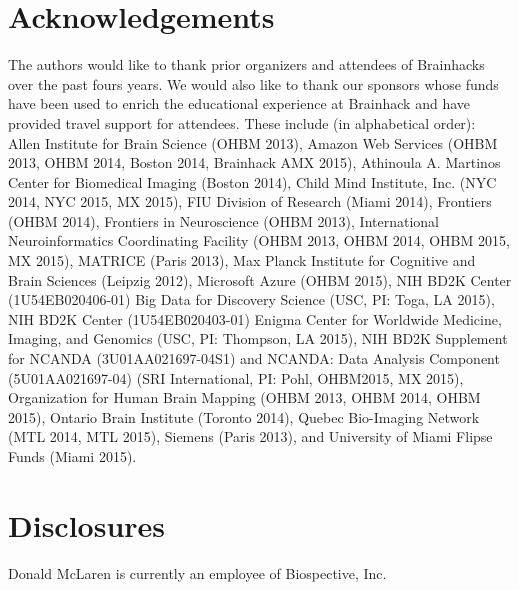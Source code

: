 \documentclass[11pt]{bmc_article_s50}
\begin{document}
\section*{Acknowledgements}
The authors would like to thank prior organizers and attendees of Brainhacks over the past fours years. We would also like to thank our sponsors whose funds have been used to enrich the educational experience at Brainhack and have provided travel support for attendees. These include (in alphabetical order): Allen Institute for Brain Science (OHBM 2013), Amazon Web Services (OHBM 2013, OHBM 2014, Boston 2014, Brainhack AMX 2015), Athinoula A. Martinos Center for Biomedical Imaging (Boston 2014), Child Mind Institute, Inc. (NYC 2014, NYC 2015, MX 2015), FIU Division of Research (Miami 2014), Frontiers (OHBM 2014), Frontiers in Neuroscience (OHBM 2013), International Neuroinformatics Coordinating Facility (OHBM 2013, OHBM 2014, OHBM 2015, MX 2015), MATRICE (Paris 2013), Max Planck Institute for Cognitive and Brain Sciences (Leipzig 2012), Microsoft Azure (OHBM 2015), NIH BD2K Center (1U54EB020406-01) Big Data for Discovery Science (USC, PI: Toga, LA 2015), NIH BD2K Center (1U54EB020403-01) Enigma Center for Worldwide Medicine, Imaging, and Genomics (USC, PI: Thompson, LA 2015), NIH BD2K Supplement for NCANDA (3U01AA021697-04S1) and NCANDA: Data Analysis Component (5U01AA021697-04) (SRI International, PI: Pohl, OHBM2015, MX 2015), Organization for Human Brain Mapping (OHBM 2013, OHBM 2014, OHBM 2015), Ontario Brain Institute (Toronto 2014), Quebec Bio-Imaging Network (MTL 2014, MTL 2015), Siemens (Paris 2013), and University of Miami Flipse Funds (Miami 2015).

\section*{Disclosures}

Donald McLaren is currently an employee of Biospective, Inc.






 
 
\end{document}
